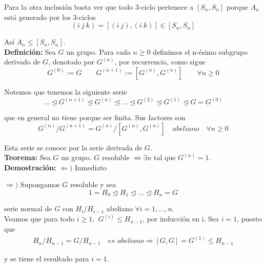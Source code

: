 \documentclass{article}
\begin{document}
Para la otra inclusión basta ver que todo 3-ciclo pertenece a $[S_n,S_n]$ porque $A_n$ está generado por los 3-ciclos
\begin{equation*}
(i\:j\:k)=[(i\:j),(i\:k)]\in [S_n,S_n]
\end{equation*}

Así $A_n\leq [S_n,S_n]$. \\

\textbf{Definición:} Sea $G$ un grupo. Para cada $n\geq 0$ definimos el n-ésimo subgrupo derivado de $G$, denotado por $G^{(n)}$, por recurrencia, como sigue
\begin{equation*}
G^{(0)}:=G \qquad G^{(n+1)}:=[G^{(n)},G^{(n)}] \qquad \forall n\geq 0
\end{equation*}

Notemos que tenemos la siguiente serie
\begin{equation*}
\ldots \unlhd G^{(n+1)}\unlhd G^{(n)}\unlhd \ldots \unlhd G^{(2)} \unlhd G^{(1)} \unlhd G=G^{(0)}
\end{equation*}

que en general no tiene porque ser finita. Sus factores son
\begin{equation*}
G^{(n)}/G^{(n+1)}=G^{(n)}/[G^{(n)},G^{(n)}] \quad abeliano \quad \forall n\geq 0
\end{equation*}

Esta serie se conoce por la serie derivada de $G$. \\

\textbf{Teorema:} Sea $G$ un grupo. $G$ resoluble $\Leftrightarrow \exists n$ tal que $G^{(n)}=1$. \\

\textbf{Demostración:} $\Leftarrow)$ Inmediato

$\Rightarrow)$ Supongamos $G$ resoluble y sea
\begin{equation*}
1=H_0\unlhd H_1\unlhd \ldots\unlhd H_n=G
\end{equation*}

serie normal de $G$ con $H_i/H_{i-1}$ abeliano $\forall i=1,\ldots,n$. \\

Veamos que para todo $i\geq 1,\:\,G^{(i)}\leq H_{n-1}$, por inducción en i. Sea $i=1$, puesto que
\begin{gather*}
H_n/H_{n-1}=G/H_{n-1}\quad es\:\,abeliano \Rightarrow [G,G]=G^{(1)}\leq H_{n-1}
\end{gather*}

y se tiene el resultado para $i=1$. \\
\end{document}
